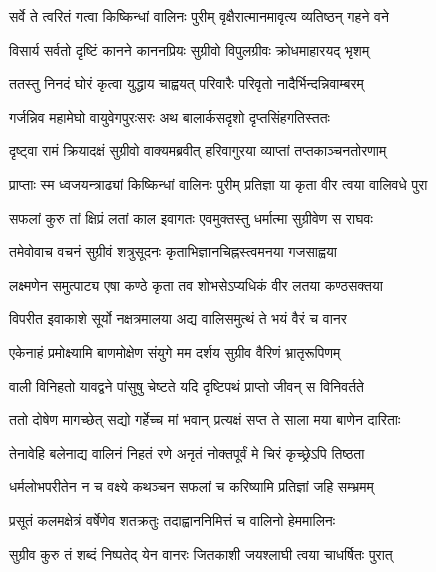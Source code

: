 
\twolineshloka
{सर्वे ते त्वरितं गत्वा किष्किन्धां वालिनः पुरीम्}
{वृक्षैरात्मानमावृत्य व्यतिष्ठन् गहने वने} %

\twolineshloka
{विसार्य सर्वतो दृष्टिं कानने काननप्रियः}
{सुग्रीवो विपुलग्रीवः क्रोधमाहारयद् भृशम्} %

\twolineshloka
{ततस्तु निनदं घोरं कृत्वा युद्धाय चाह्वयत्}
{परिवारैः परिवृतो नादैर्भिन्दन्निवाम्बरम्} %

\twolineshloka
{गर्जन्निव महामेघो वायुवेगपुरःसरः}
{अथ बालार्कसदृशो दृप्तसिंहगतिस्ततः} %

\twolineshloka
{दृष्ट्वा रामं क्रियादक्षं सुग्रीवो वाक्यमब्रवीत्}
{हरिवागुरया व्याप्तां तप्तकाञ्चनतोरणाम्} %

\twolineshloka
{प्राप्ताः स्म ध्वजयन्त्राढ्यां किष्किन्धां वालिनः पुरीम्}
{प्रतिज्ञा या कृता वीर त्वया वालिवधे पुरा} %

\twolineshloka
{सफलां कुरु तां क्षिप्रं लतां काल इवागतः}
{एवमुक्तस्तु धर्मात्मा सुग्रीवेण स राघवः} %

\twolineshloka
{तमेवोवाच वचनं सुग्रीवं शत्रुसूदनः}
{कृताभिज्ञानचिह्नस्त्वमनया गजसाह्वया} %

\twolineshloka
{लक्ष्मणेन समुत्पाट्य एषा कण्ठे कृता तव}
{शोभसेऽप्यधिकं वीर लतया कण्ठसक्तया} %

\twolineshloka
{विपरीत इवाकाशे सूर्यो नक्षत्रमालया}
{अद्य वालिसमुत्थं ते भयं वैरं च वानर} %

\twolineshloka
{एकेनाहं प्रमोक्ष्यामि बाणमोक्षेण संयुगे}
{मम दर्शय सुग्रीव वैरिणं भ्रातृरूपिणम्} %

\twolineshloka
{वाली विनिहतो यावद्वने पांसुषु चेष्टते}
{यदि दृष्टिपथं प्राप्तो जीवन् स विनिवर्तते} %

\twolineshloka
{ततो दोषेण मागच्छेत् सद्यो गर्हेच्च मां भवान्}
{प्रत्यक्षं सप्त ते साला मया बाणेन दारिताः} %

\twolineshloka
{तेनावेहि बलेनाद्य वालिनं निहतं रणे}
{अनृतं नोक्तपूर्वं मे चिरं कृच्छ्रेऽपि तिष्ठता} %

\twolineshloka
{धर्मलोभपरीतेन न च वक्ष्ये कथञ्चन}
{सफलां च करिष्यामि प्रतिज्ञां जहि सम्भ्रमम्} %

\twolineshloka
{प्रसूतं कलमक्षेत्रं वर्षेणेव शतक्रतुः}
{तदाह्वाननिमित्तं च वालिनो हेममालिनः} %

\twolineshloka
{सुग्रीव कुरु तं शब्दं निष्पतेद् येन वानरः}
{जितकाशी जयश्लाघी त्वया चाधर्षितः पुरात्} %

